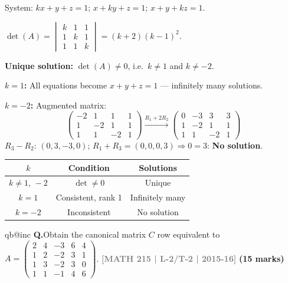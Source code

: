 \documentclass[12pt,a3paper]{article}
\makeatletter
\newcommand{\yr}[1]{\hfill\textcolor{gray}{\small\textbf{[#1]}}}
\newcommand{\mk}[1]{\textcolor{orange!70!black}{\small\textbf{(#1 marks)}}}
\newcounter{qnum}
\newcommand{\Q}[1]{%
  \csname qb@inc\endcsname
  \needspace{4\baselineskip}
  \refstepcounter{qnum}
  \vspace{6pt}
  \noindent\textbf{Q\theqnum.}\enspace #1\par
}
\makeatother
\begin{document}
\begin{tcolorbox}[enhanced,breakable,
  colback=cB!4,colframe=cB,boxrule=0.8pt,arc=5pt,
  title={\textbf{Answer --- Values of $k$: Unique/No/Infinitely Many Solutions}},
  fonttitle=\bfseries\color{white},colbacktitle=cB]

System: $kx+y+z=1$;\; $x+ky+z=1$;\; $x+y+kz=1$.

$\det(A)=\begin{vmatrix}k&1&1\\1&k&1\\1&1&k\end{vmatrix}=(k+2)(k-1)^2$.

\textbf{Unique solution:} $\det(A)\neq0$, i.e.\ $k\neq1$ and $k\neq-2$.

\textbf{$k=1$:} All equations become $x+y+z=1$ --- infinitely many solutions.

\textbf{$k=-2$:} Augmented matrix:
\[
\begin{pmatrix}-2&1&1&1\\1&-2&1&1\\1&1&-2&1\end{pmatrix}
\xrightarrow{R_1+2R_2}
\begin{pmatrix}0&-3&3&3\\1&-2&1&1\\1&1&-2&1\end{pmatrix}
\]
$R_3-R_2$: $(0,3,-3,0)$; $R_1+R_3=(0,0,0,3)\Rightarrow 0=3$: \textbf{No solution}.

\begin{center}
\small\begin{tabular}{@{}ccc@{}}
\toprule
$k$ & Condition & Solutions \\
\midrule
$k\neq1,\,-2$ & $\det\neq0$ & Unique \\
$k=1$ & Consistent, rank 1 & Infinitely many \\
$k=-2$ & Inconsistent & No solution \\
\bottomrule
\end{tabular}
\end{center}

\end{tcolorbox}


\Q{Obtain the canonical matrix $C$ row equivalent to $A = \begin{pmatrix} 2 & 4 & -3 & 6 & 4 \\ 1 & 2 & -2 & 3 & 1 \\ 1 & 3 & -2 & 3 & 0 \\ 1 & 1 & -1 & 4 & 6 \end{pmatrix}$.
\yr{MATH 215 | L-2/T-2 | 2015-16} \mk{15}}
\end{document}
